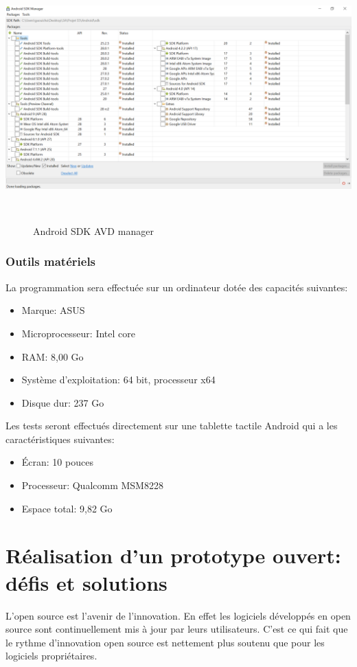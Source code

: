 \documentclass{report}
\begin{document}
\begin{itemize}
    \begin{center}
    \includegraphics[height=250pt]{SDK.png}
    \end{center}
    \begin{figure}[H]
        \centering
        \caption{Android SDK AVD manager}
        \label{fig:SDK}
    \end{figure}
\end{itemize}


\subsubsection{Outils matériels}
La programmation sera effectuée sur un ordinateur dotée des capacités suivantes:
\begin{itemize}
    \item Marque: ASUS
    \item Microprocesseur: Intel core 
    \item RAM: 8,00 Go
    \item Système d'exploitation: 64 bit, processeur x64
    \item Disque dur: 237 Go
\end{itemize}
Les tests seront effectués directement sur une tablette tactile Android qui a les caractéristiques suivantes:
\begin{itemize}
    \item Écran: 10 pouces
    \item Processeur: Qualcomm MSM8228
    \item Espace total: 9,82 Go
\end{itemize}


\section{Réalisation d'un prototype ouvert: défis et solutions}
L'open source est l'avenir de l'innovation. En effet les logiciels développés en open source sont continuellement mis à jour par leurs utilisateurs. C’est ce qui fait que le rythme d’innovation open source est nettement plus soutenu que pour les logiciels propriétaires.\\
\end{document}
